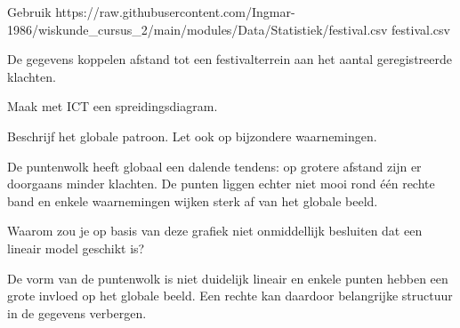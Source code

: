 \documentclass{ximera}
\begin{document}
\begin{oefening}{\oefU \ESS}

Gebruik \csv
{https://raw.githubusercontent.com/Ingmar-1986/wiskunde_cursus_2/main/modules/Data/Statistiek/festival.csv}
{festival.csv}

De gegevens koppelen afstand tot een festivalterrein aan het aantal
geregistreerde klachten.

Maak met ICT een spreidingsdiagram.

\begin{question}
Beschrijf het globale patroon. Let ook op bijzondere waarnemingen.

\begin{oplossing}
De puntenwolk heeft globaal een dalende tendens: op grotere afstand
zijn er doorgaans minder klachten. De punten liggen echter niet mooi
rond één rechte band en enkele waarnemingen wijken sterk af van het
globale beeld.
\end{oplossing}
\end{question}

\begin{question}
Waarom zou je op basis van deze grafiek niet onmiddellijk besluiten
dat een lineair model geschikt is?

\begin{oplossing}
De vorm van de puntenwolk is niet duidelijk lineair en enkele punten
hebben een grote invloed op het globale beeld. Een rechte kan daardoor
belangrijke structuur in de gegevens verbergen.
\end{oplossing}
\end{question}

\end{oefening}
\end{document}

